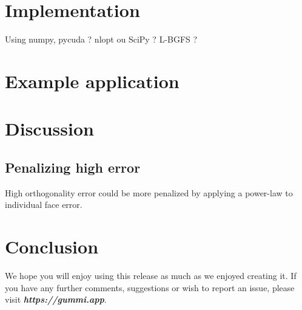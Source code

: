 \documentclass[11pt]{article}
\begin{document}
\section{Implementation}

Using numpy, pycuda ? nlopt ou SciPy ? L-BGFS ?


\section{Example application}



\section{Discussion}

\subsection{Penalizing high error}
High orthogonality error could be more penalized by applying a power-law to individual face error. 

\section{Conclusion}

We hope you will enjoy using this release as much as we enjoyed creating it. If you have any further comments, suggestions or wish to report an issue, please visit \emph{\textbf{https://gummi.app}}. 
\end{document}
